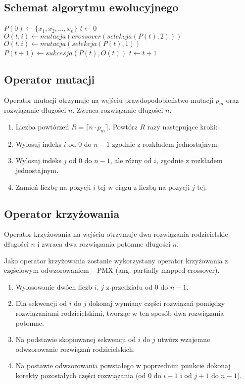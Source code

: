 \documentclass[12pt, a4paper]{article}
\begin{document}
\subsection{Schemat algorytmu ewolucyjnego}

\begin{algorithm}[!htb]
\label{ea}
\begin{algorithmic}[1]
	\State $P(0) \gets \{x_1, x_2, \ldots, x_n\}$
	\State $t \gets 0$
    			\State $O(t,i) \gets mutacja(crossover(selekcja(P(t), 2)))$
    		\Else
    			\State $O(t,i) \gets mutacja(selekcja(P(t),1))$
    		\EndIf
    	\EndFor
    \State $P(t+1) \gets sukcesja(P(t),O(t))$
    \State $t \gets t+1$
  	\EndWhile
\EndFunction
\end{algorithmic}
\end{algorithm}

\subsection{Operator mutacji}

Operator mutacji otrzymuje na wejściu prawdopodobieństwo mutacji $p_m$ oraz rozwiązanie długości $n$.
Zwraca rozwiązanie długości $n$.

\begin{enumerate}
 \item Liczba powtórzeń $R = \lceil n \cdot  p_m \rceil$. Powtórz $R$ razy następujące kroki:
 \item Wylosuj indeks $i$ od 0 do $n-1$ zgodnie z rozkładem jednostajnym.
 \item Wylosuj indeks $j$ od 0 do $n-1$, ale różny od $i$, zgodnie z rozkładem jednostajnym.
 \item Zamień liczbę na pozycji $i$-tej w ciągu z liczbą na pozycji $j$-tej.
\end{enumerate}

\subsection{Operator krzyżowania}

Operator krzyżowania na wejściu otrzymuje dwa rozwiązania rodzicielskie długości $n$ i zwraca dwa rozwiązania potomne długości $n$. 

Jako operator krzyżowania zostanie wykorzystany operator krzyżowania z częściowym odwzorowaniem -- {PMX} (ang. partially mapped crossover).
\begin{enumerate}
 \item Wylosowanie dwóch liczb $i$, $j$ z przedziału od $0$ do $n-1$.
 \item Dla sekwencji od $i$ do $j$ dokonaj wymiany części rozwiązań pomiędzy rozwiązaniami rodzicielskimi, tworząc w ten sposób dwa rozwiązania potomne.
 \item Na podstawie skopiowanej sekwencji od $i$ do $j$ utwórz wzajemne odwzorowanie rozwiązań rodzicielskich.
 \item Na postawie odwzorowania powstałego w poprzednim punkcie dokonaj korekty pozostałych części rozwiązania (od $0$ do $i-1$ i od $j+1$ do $n-1$).
\end{enumerate}
\end{document}
